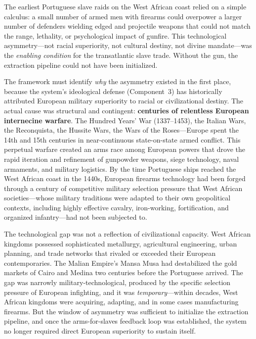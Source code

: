 \documentclass[12pt,openany]{book}
\begin{document}
The earliest Portuguese slave raids on the West African coast relied on a simple calculus: a small number of armed men with firearms could overpower a larger number of defenders wielding edged and projectile weapons that could not match the range, lethality, or psychological impact of gunfire. This technological asymmetry---not racial superiority, not cultural destiny, not divine mandate---was the \textit{enabling condition} for the transatlantic slave trade. Without the gun, the extraction pipeline could not have been initialized.

The framework must identify \textit{why} the asymmetry existed in the first place, because the system's ideological defense (Component~3) has historically attributed European military superiority to racial or civilizational destiny. The actual cause was structural and contingent: \textbf{centuries of relentless European internecine warfare}. The Hundred Years' War (1337--1453), the Italian Wars, the Reconquista, the Hussite Wars, the Wars of the Roses---Europe spent the 14th and 15th centuries in near-continuous state-on-state armed conflict. This perpetual warfare created an arms race among European powers that drove the rapid iteration and refinement of gunpowder weapons, siege technology, naval armaments, and military logistics. By the time Portuguese ships reached the West African coast in the 1440s, European firearms technology had been forged through a century of competitive military selection pressure that West African societies---whose military traditions were adapted to their own geopolitical contexts, including highly effective cavalry, iron-working, fortification, and organized infantry---had not been subjected to.

The technological gap was not a reflection of civilizational capacity. West African kingdoms possessed sophisticated metallurgy, agricultural engineering, urban planning, and trade networks that rivaled or exceeded their European contemporaries. The Malian Empire's Mansa Musa had destabilized the gold markets of Cairo and Medina two centuries before the Portuguese arrived. The gap was narrowly military-technological, produced by the specific selection pressure of European infighting, and it was \textit{temporary}---within decades, West African kingdoms were acquiring, adapting, and in some cases manufacturing firearms. But the window of asymmetry was sufficient to initialize the extraction pipeline, and once the arms-for-slaves feedback loop was established, the system no longer required direct European superiority to sustain itself.
\end{document}
